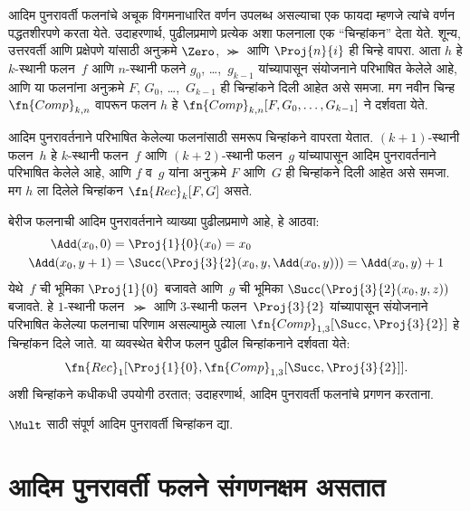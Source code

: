 आदिम पुनरावर्ती फलनांचे अचूक विगमनाधारित वर्णन उपलब्ध असल्याचा एक फायदा
म्हणजे त्यांचे वर्णन पद्धतशीरपणे करता येते. उदाहरणार्थ, पुढीलप्रमाणे
प्रत्येक अशा फलनाला एक ``चिन्हांकन'' देता येते. शून्य, उत्तरवर्ती आणि
प्रक्षेपणे यांसाठी अनुक्रमे $\Zero$, $\Succ$ आणि $\Proj{n}{i}$ ही चिन्हे
वापरा. आता $h$ हे $k$-स्थानी फलन~$f$ आणि $n$-स्थानी फलने $g_0$,
\dots,~$g_{k-1}$ यांच्यापासून संयोजनाने परिभाषित केलेले आहे, आणि या
फलनांना अनुक्रमे $F$, $G_0$, \dots,~$G_{k-1}$ ही चिन्हांकने दिली आहेत
असे समजा. मग नवीन चिन्ह $\fn{Comp}_{k,n}$ वापरून फलन $h$ हे
$\fn{Comp}_{k,n}[F,G_0,\dots,G_{k-1}]$ ने दर्शवता येते.

आदिम पुनरावर्तनाने परिभाषित केलेल्या फलनांसाठी समरूप चिन्हांकने वापरता
येतात. $(k+1)$-स्थानी फलन~$h$ हे $k$-स्थानी फलन~$f$ आणि $(k+2)$-स्थानी
फलन~$g$ यांच्यापासून आदिम पुनरावर्तनाने परिभाषित केलेले आहे, आणि $f$
व~$g$ यांना अनुक्रमे $F$ आणि~$G$ ही चिन्हांकने दिली आहेत असे समजा. मग
$h$ ला दिलेले चिन्हांकन $\fn{Rec}_k[F,G]$ असते.

बेरीज फलनाची आदिम पुनरावर्तनाने व्याख्या पुढीलप्रमाणे आहे, हे आठवा:
\begin{align*}
  \Add(x_0, 0) & = \Proj{1}{0}(x_0) = x_0\\
  \Add(x_0, y+1) & = \Succ(\Proj{3}{2}(x_0, y, \Add(x_0, y))) = \Add(x_0, y) +1
\end{align*}
येथे~$f$ ची भूमिका $\Proj{1}{0}$ बजावते आणि~$g$ ची भूमिका
$\Succ(\Proj{3}{2}(x_0, y, z))$ बजावते. हे $1$-स्थानी फलन~$\Succ$
आणि $3$-स्थानी फलन~$\Proj{3}{2}$ यांच्यापासून संयोजनाने परिभाषित
केलेल्या फलनाचा परिणाम असल्यामुळे त्याला
$\fn{Comp}_{1,3}[\Succ,\Proj{3}{2}]$ हे चिन्हांकन दिले जाते. या
व्यवस्थेत बेरीज फलन पुढील चिन्हांकनाने दर्शवता येते:
\[\fn{Rec}_1[\Proj{1}{0},\fn{Comp}_{1,3}[\Succ,\Proj{3}{2}]].
\]
अशी चिन्हांकने कधीकधी उपयोगी ठरतात; उदाहरणार्थ, आदिम पुनरावर्ती फलनांचे
प्रगणन करताना.

\begin{prob}
  $\Mult$ साठी संपूर्ण आदिम पुनरावर्ती चिन्हांकन द्या.
\end{prob}











\section{आदिम पुनरावर्ती फलने संगणनक्षम असतात}\label{cmp:rec:cmp:sec}

